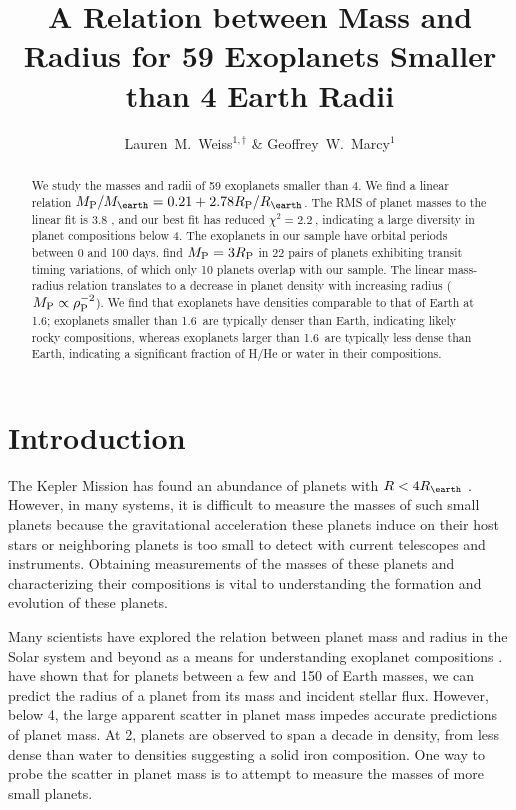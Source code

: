 \documentclass[iop]{emulateapj}
\newcommand{\chisquared}{2.2~}
\newcommand{\rms}{3.8 \mearth}
\begin{document}
\title{A Relation between Mass and Radius for 59 Exoplanets Smaller than 4 Earth Radii}
\author{Lauren~M.~Weiss$^{1,\dagger}$ \& Geoffrey~W.~Marcy$^1$}

\begin{abstract}
We study the masses and radii of 59 exoplanets smaller than 4\rearth.  We find a linear relation $\mpl/\mearth = 0.21 + 2.78\rpl/\rearth$.  The RMS of planet masses to the linear fit is \rms, and our best fit has reduced $\chi^2=\chisquared$, indicating a large diversity in planet compositions below 4\rearth.  The exoplanets in our sample have orbital periods between 0 and 100 days.  \citet{WL2013} find $M_{\rm P} = 3R_{\rm P}$ in 22 pairs of planets exhibiting transit timing variations, of which only 10 planets overlap with our sample.  The linear mass-radius relation translates to a decrease in planet density with increasing radius ($M_{\rm P} \propto \rho_{\rm P}^{-2}$).  We find that exoplanets have densities comparable to that of Earth at 1.6\rearth; exoplanets smaller than 1.6\rearth\ are typically denser than Earth, indicating likely rocky compositions, whereas exoplanets larger than 1.6\rearth\ are typically less dense than Earth, indicating a significant fraction of H/He or water in their compositions.
\end{abstract}

\section{Introduction}

The Kepler Mission has found an abundance of planets with  $R < 4\rearth$ \citep{Batalha2013, Burke2013}.  However, in many systems, it is difficult to measure the masses of such small planets because the gravitational acceleration these planets induce on their host stars or neighboring planets is too small to detect with current telescopes and instruments.  Obtaining measurements of the masses of these planets and characterizing their compositions is vital to understanding the formation and evolution of these planets.

Many scientists have explored the relation between planet mass and radius in the Solar system and beyond as a means for understanding exoplanet compositions \citep{Lissauer2011, Enoch2012, Kane2012, Seager2007}.  \citet{Weiss2013} have shown that for planets between a few and 150 of Earth masses, we can predict the radius of a planet from its mass and incident stellar flux.  However, below 4\rearth, the large apparent scatter in planet mass impedes accurate predictions of planet mass.  At 2\rearth, planets are observed to span a decade in density, from less dense than water to densities suggesting a solid iron composition.  One way to probe the scatter in planet mass is to attempt to measure the masses of more small planets.  
\end{document}

